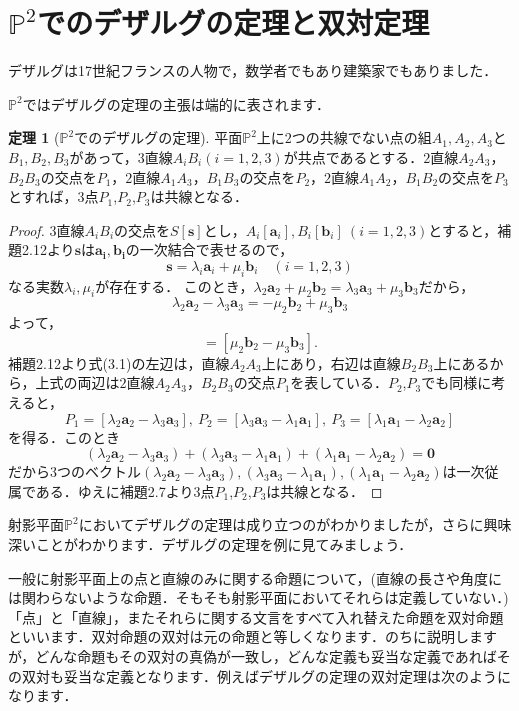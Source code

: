 \documentclass{jsarticle}
\theoremstyle{definition}
\newtheorem{theorem}{定理}
\numberwithin{theorem}{section}
\numberwithin{equation}{section}
\begin{document}
\section{$\mathbb{P}^2$でのデザルグの定理と双対定理}
デザルグは17世紀フランスの人物で，数学者でもあり建築家でもありました．
\par $\mathbb{P}^2$ではデザルグの定理の主張は端的に表されます．
\begin{theorem}[$\mathbb{P}^2$でのデザルグの定理]
平面$\mathbb{P}^2$上に$2$つの共線でない点の組$A_1 ,A_2 ,A_3$と$B_1 ,B_2 ,B_3$があって，$3$直線$A_i B_i (i=1,2,3)$が共点であるとする．$2$直線$A_2 A_3$，$B_2 B_3$の交点を$P_1$，$2$直線$A_1 A_3$，$B_1 B_3$の交点を$P_2$，$2$直線$A_1 A_2$，$B_1 B_2$の交点を$P_3$とすれば，$3$点$P_1$,$P_2$,$P_3$は共線となる．
\end{theorem}
\begin{proof}
3直線$A_i B_i$の交点を$S[\bm{s}]$とし，$A_i [\bm{a}_i],B_i [\bm{b}_i]\ (i=1,2,3)$とすると，補題2.12より$\bm{s}$は$\bm{a_i},\bm{b_i}$の一次結合で表せるので，
$$\bm{s}=\lambda_i \bm{a}_i+\mu_i \bm{b}_i\quad (i=1,2,3)$$
なる実数$\lambda_i ,\mu_i$が存在する．
このとき，$\lambda_2 \bm{a}_2+\mu_2 \bm{b}_2=\lambda_3 \bm{a}_3+\mu_3 \bm{b}_3$だから，
$$\lambda_2 \bm{a}_2-\lambda_3 \bm{a}_3=-\mu_2 \bm{b}_2+\mu_3 \bm{b}_3$$
よって，
\begin{equation}[\lambda_2 \bm{a}_2-\lambda_3 \bm{a}_3]=[\mu_2 \bm{b}_2-\mu_3 \bm{b}_3].\end{equation}
補題2.12より式(3.1)の左辺は，直線$A_2 A_3$上にあり，右辺は直線$B_2 B_3$上にあるから，上式の両辺は$2$直線$A_2 A_3$，$B_2 B_3$の交点$P_1$を表している．$P_2$,$P_3$でも同様に考えると，
$$P_1 =[\lambda_2 \bm{a}_2-\lambda_3 \bm{a}_3],\ P_2 =[\lambda_3 \bm{a}_3-\lambda_1 \bm{a}_1],\ P_3 =[\lambda_1 \bm{a}_1-\lambda_2 \bm{a}_2]$$
を得る．このとき
$$(\lambda_2 \bm{a}_2-\lambda_3 \bm{a}_3)+(\lambda_3 \bm{a}_3-\lambda_1 \bm{a}_1)+(\lambda_1 \bm{a}_1-\lambda_2 \bm{a}_2)=\bm{0}$$
だから3つのベクトル$(\lambda_2 \bm{a}_2-\lambda_3 \bm{a}_3),(\lambda_3 \bm{a}_3-\lambda_1 \bm{a}_1),(\lambda_1 \bm{a}_1-\lambda_2 \bm{a}_2)$は一次従属である．ゆえに補題2.7より$3$点$P_1$,$P_2$,$P_3$は共線となる．
\end{proof}
射影平面$\mathbb{P}^2$においてデザルグの定理は成り立つのがわかりましたが，さらに興味深いことがわかります．デザルグの定理を例に見てみましょう．
\par 一般に射影平面上の点と直線のみに関する命題について，(直線の長さや角度には関わらないような命題．そもそも射影平面においてそれらは定義していない．)「点」と「直線」，またそれらに関する文言をすべて入れ替えた命題を双対命題といいます．双対命題の双対は元の命題と等しくなります．のちに説明しますが，どんな命題もその双対の真偽が一致し，どんな定義も妥当な定義であればその双対も妥当な定義となります．例えばデザルグの定理の双対定理は次のようになります．
\end{document}
